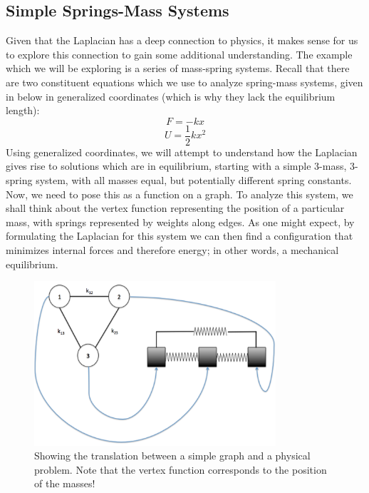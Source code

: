 \subsection{Simple Springs-Mass Systems}
Given that the Laplacian has a deep connection to physics, it makes
sense for us to explore this connection to gain some additional
understanding. The example which we will be exploring is a series of
mass-spring systems. Recall that there are two constituent equations
which we use to analyze spring-mass systems, given in below in
generalized coordinates (which is why they lack the equilibrium
length): 
\[
F = -kx
\]
\[
U = \frac{1}{2}kx^2
\]
Using generalized coordinates, we will attempt to understand how the
Laplacian gives rise to solutions which are in equilibrium, starting
with a simple 3-mass, 3-spring system, with all masses equal, but
potentially different spring constants. Now, we need to pose this as a
function on a graph. To analyze this system, we shall think about the
vertex function representing the position of a particular mass, with
springs represented by weights along edges. As one might expect, by
formulating the Laplacian for this system we can then find a
configuration that minimizes internal forces and therefore energy; in
other words, a mechanical equilibrium. 
\begin{figure}[ht]
\centering
\includegraphics[width=0.8\textwidth, height=0.4\textheight]{chapter_3/files/springs.png}
\caption{Showing the translation between a simple graph and a physical
  problem. Note that the vertex function corresponds to the position
  of the masses!} 
\label{fig:springs}
\end{figure}

